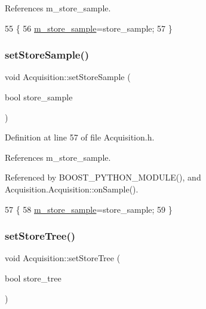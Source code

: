 References m\+\_\+store\+\_\+sample.


\begin{DoxyCode}
55                                         \{
56     \hyperlink{classAcquisition_a987cc1d04007cf1f5acc1accfd0909e5}{m\_store\_sample}=store\_sample;
57   \}
\end{DoxyCode}
\mbox{\label{classAcquisition_af36a1b660244096b7d274f591f67b695}} 
\subsubsection{\texorpdfstring{set\+Store\+Sample()}{setStoreSample()}\hspace{0.1cm}{\footnotesize\ttfamily [2/2]}}
{\footnotesize\ttfamily void Acquisition\+::set\+Store\+Sample (\begin{DoxyParamCaption}\item[{bool}]{store\+\_\+sample }\end{DoxyParamCaption})\hspace{0.3cm}{\ttfamily [inline]}}



Definition at line 57 of file Acquisition.\+h.



References m\+\_\+store\+\_\+sample.



Referenced by B\+O\+O\+S\+T\+\_\+\+P\+Y\+T\+H\+O\+N\+\_\+\+M\+O\+D\+U\+L\+E(), and Acquisition.\+Acquisition\+::on\+Sample().


\begin{DoxyCode}
57                                         \{
58     \hyperlink{classAcquisition_a987cc1d04007cf1f5acc1accfd0909e5}{m\_store\_sample}=store\_sample;
59   \}
\end{DoxyCode}
\mbox{\label{classAcquisition_a759193856d26354722e5f647e60e16de}} 
\subsubsection{\texorpdfstring{set\+Store\+Tree()}{setStoreTree()}\hspace{0.1cm}{\footnotesize\ttfamily [1/2]}}
{\footnotesize\ttfamily void Acquisition\+::set\+Store\+Tree (\begin{DoxyParamCaption}\item[{bool}]{store\+\_\+tree }\end{DoxyParamCaption})\hspace{0.3cm}{\ttfamily [inline]}}




